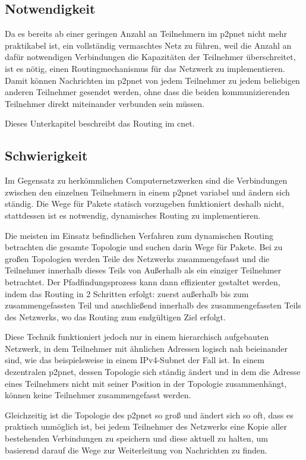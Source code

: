 
\subsection{Notwendigkeit}
Da es bereits ab einer geringen Anzahl an Teilnehmern im \gls{p2pnet} nicht mehr praktikabel ist,
ein vollständig vermaschtes Netz zu führen, weil die Anzahl an dafür notwendigen Verbindungen die
Kapazitäten der Teilnehmer überschreitet, ist es nötig, einen Routingmechanismus für das Netzwerk
zu implementieren. Damit können Nachrichten im \gls{p2pnet} von jedem Teilnehmer zu jedem beliebigen
anderen Teilnehmer gesendet werden, ohne dass die beiden kommunizierenden Teilnehmer direkt
miteinander verbunden sein müssen.

Dieses Unterkapitel beschreibt das Routing im \gls{cnet}.

\subsection{Schwierigkeit}
Im Gegensatz zu herkömmlichen Computernetzwerken sind die Verbindungen zwischen den einzelnen
Teilnehmern in einem \gls{p2pnet} variabel und ändern sich ständig. Die Wege für Pakete statisch
vorzugeben funktioniert deshalb nicht, stattdessen ist es notwendig, dynamisches Routing zu
implementieren.

Die meisten im Einsatz befindlichen Verfahren zum dynamischen Routing betrachten die gesamte
Topologie und suchen darin Wege für Pakete. Bei zu großen Topologien werden Teile des Netzwerks
zusammengefasst und die Teilnehmer innerhalb dieses Teils von Außerhalb als ein einziger Teilnehmer
betrachtet. Der Pfadfindungsprozess kann dann effizienter gestaltet werden, indem das Routing in
2 Schritten erfolgt: zuerst außerhalb bis zum zusammengefassten Teil und anschließend innerhalb
des zusammengefassten Teils des Netzwerks, wo das Routing zum endgültigen Ziel erfolgt.

Diese Technik funktioniert jedoch nur in einem hierarchisch aufgebauten Netzwerk, in dem Teilnehmer
mit ähnlichen Adressen logisch nah beieinander sind, wie das beispielsweise in einem IPv4-Subnet
der Fall ist. In einem dezentralen \gls{p2pnet}, dessen Topologie sich ständig ändert und in dem
die Adresse eines Teilnehmers nicht mit seiner Position in der Topologie zusammenhängt, können
keine Teilnehmer zusammengefasst werden.

Gleichzeitig ist die Topologie des \gls{p2pnet} so groß und ändert sich so oft, dass es praktisch
unmöglich ist, bei jedem Teilnehmer des Netzwerks eine Kopie aller bestehenden Verbindungen zu
speichern und diese aktuell zu halten, um basierend darauf die Wege zur Weiterleitung von
Nachrichten zu finden.

